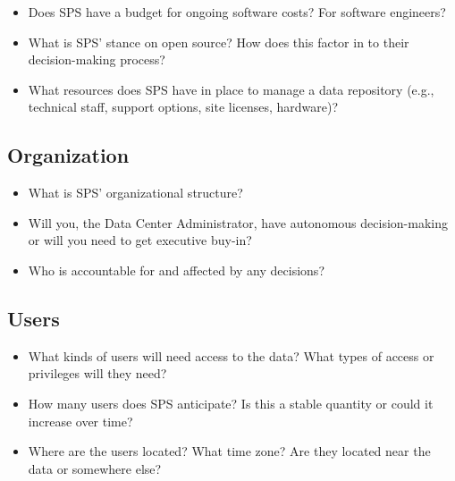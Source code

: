 \documentclass[10pt,oneside]{memoir}
\begin{document}
\begin{itemize}
 \item Does SPS have a budget for ongoing software costs? For software engineers?
 \item What is SPS' stance on open source? How does this factor in to their decision-making process?
 \item What resources does SPS have in place to manage a data repository (e.g., technical staff, support options, site licenses, hardware)?
\end{itemize}

\subsection{Organization}

\begin{itemize}
 \item What is SPS' organizational structure?
 \item Will you, the Data Center Administrator, have autonomous decision-making or will you need to get executive buy-in?
 \item Who is accountable for and affected by any decisions?
\end{itemize}

\subsection{Users}

\begin{itemize}
 \item What kinds of users will need access to the data? What types of access or privileges will they need?
 \item How many users does SPS anticipate? Is this a stable quantity or could it increase over time?
 \item Where are the users located? What time zone? Are they located near the data or somewhere else?
\end{itemize}
\end{document}

